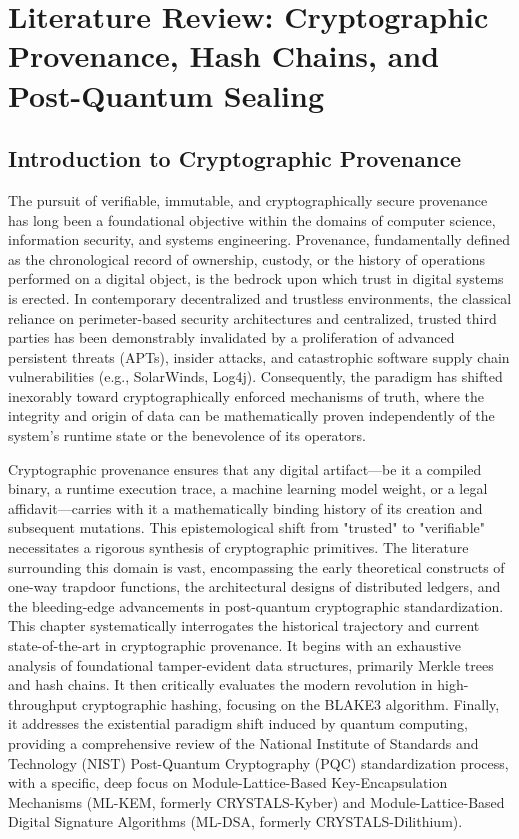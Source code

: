 \chapter{Literature Review: Cryptographic Provenance, Hash Chains, and Post-Quantum Sealing}
\label{ch:lit_review_crypto}

\section{Introduction to Cryptographic Provenance}
\label{sec:crypto_prov_intro}

The pursuit of verifiable, immutable, and cryptographically secure provenance has long been a foundational objective within the domains of computer science, information security, and systems engineering. Provenance, fundamentally defined as the chronological record of ownership, custody, or the history of operations performed on a digital object, is the bedrock upon which trust in digital systems is erected. In contemporary decentralized and trustless environments, the classical reliance on perimeter-based security architectures and centralized, trusted third parties has been demonstrably invalidated by a proliferation of advanced persistent threats (APTs), insider attacks, and catastrophic software supply chain vulnerabilities (e.g., SolarWinds, Log4j). Consequently, the paradigm has shifted inexorably toward cryptographically enforced mechanisms of truth, where the integrity and origin of data can be mathematically proven independently of the system's runtime state or the benevolence of its operators.

Cryptographic provenance ensures that any digital artifact—be it a compiled binary, a runtime execution trace, a machine learning model weight, or a legal affidavit—carries with it a mathematically binding history of its creation and subsequent mutations. This epistemological shift from "trusted" to "verifiable" necessitates a rigorous synthesis of cryptographic primitives. The literature surrounding this domain is vast, encompassing the early theoretical constructs of one-way trapdoor functions, the architectural designs of distributed ledgers, and the bleeding-edge advancements in post-quantum cryptographic standardization. This chapter systematically interrogates the historical trajectory and current state-of-the-art in cryptographic provenance. It begins with an exhaustive analysis of foundational tamper-evident data structures, primarily Merkle trees and hash chains. It then critically evaluates the modern revolution in high-throughput cryptographic hashing, focusing on the BLAKE3 algorithm. Finally, it addresses the existential paradigm shift induced by quantum computing, providing a comprehensive review of the National Institute of Standards and Technology (NIST) Post-Quantum Cryptography (PQC) standardization process, with a specific, deep focus on Module-Lattice-Based Key-Encapsulation Mechanisms (ML-KEM, formerly CRYSTALS-Kyber) and Module-Lattice-Based Digital Signature Algorithms (ML-DSA, formerly CRYSTALS-Dilithium).

